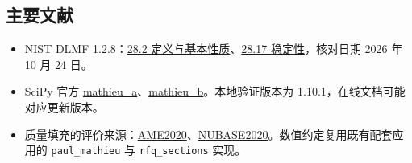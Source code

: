 \documentclass[
  aps,
  onecolumn,
  11pt]{revtex4-2}
\providecommand{\tightlist}{%
  \setlength{\itemsep}{0pt}\setlength{\parskip}{0pt}}
\begin{document}
\subsection{主要文献}\label{ux4e3bux8981ux6587ux732e}

\begin{itemize}
\tightlist
\item
  NIST DLMF 1.2.8：\href{https://dlmf.nist.gov/28.2}{28.2
  定义与基本性质}、\href{https://dlmf.nist.gov/28.17}{28.17
  稳定性}，核对日期 2026 年 10 月 24 日。
\item
  SciPy 官方
  \href{https://docs.scipy.org/doc/scipy/reference/generated/scipy.special.mathieu_a.html}{mathieu\_a}、\href{https://docs.scipy.org/doc/scipy/reference/generated/scipy.special.mathieu_b.html}{mathieu\_b}。本地验证版本为
  1.10.1，在线文档可能对应更新版本。
\item
  质量填充的评价来源：\href{https://www-nds.iaea.org/amdc/ame2020/mass_1.mas20.txt}{AME2020}、\href{https://www-nds.iaea.org/amdc/ame2020/nubase_4.mas20.txt}{NUBASE2020}。数值约定复用既有配套应用的
  \texttt{paul\_mathieu} 与 \texttt{rfq\_sections} 实现。
\end{itemize}
\end{document}
